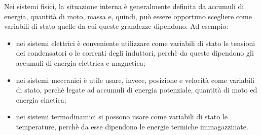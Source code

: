 \documentclass[a4paper]{report}
\begin{document}
Nei sistemi fisici, la situazione interna \`e generalmente definita da
accumuli di energia, quantit\`a di moto, massa e, quindi, pu\`o essere
opportuno scegliere come variabili di stato quelle da cui queste
grandezze dipendono. Ad esempio:
\begin{itemize}
\item nei sistemi elettrici \`e conveniente utilizzare come variabili
  di stato le tensioni dei condensatori o le correnti degli induttori,
  perch\`e da queste dipendono gli accumuli di energia elettrica e magnetica;
\item nei sistemi meccanici \`e utile usare, invece, posizione e
  velocit\`a come variabili di stato, perch\`e legate ad accumuli di
  energia potenziale, quantit\`a di moto ed energia cinetica;
\item nei sistemi termodinamici si possono usare come variabili di
  stato le temperature, perch\`e da esse dipendono le energie termiche
  immagazzinate.
\end{itemize}
\end{document}

